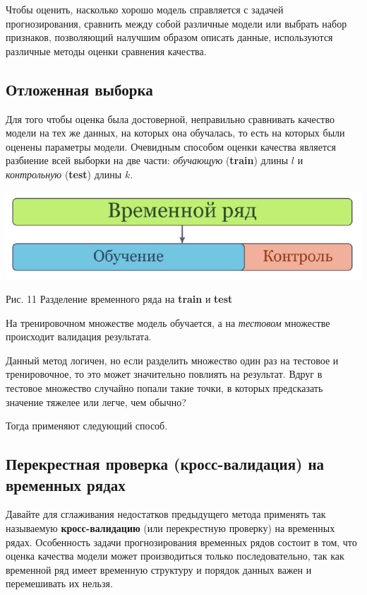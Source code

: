 \documentclass[aps,%
12pt,%
final,%
oneside,
onecolumn,%
musixtex, %
superscriptaddress,%
centertags]{article} %
\theoremstyle{plain}
\theoremstyle{definition}
\theoremstyle{remark}
\begin{document}
Чтобы оценить, насколько хорошо модель справляется с задачей прогнозирования, сравнить между собой различные модели или выбрать набор признаков, позволяющий налучшим образом описать данные, используются различные методы оценки сравнения качества.

\subsection{Отложенная выборка}

Для того чтобы оценка была достоверной, неправильно сравнивать качество модели на тех же данных, на которых она обучалась, то есть на которых были оценены параметры модели.  Очевидным способом оценки качества является разбиение всей выборки на две части: \textit{обучающую} (\textbf{train}) длины $l$ и \textit{контрольную} (\textbf{test}) длины $k$.

\begin{center}
	\includegraphics[scale=0.5]{images/11.png}

	Рис. 11 Разделение временного ряда на \textbf{train} и \textbf{test}
\end{center}

	
На тренировочном множестве модель обучается, а на \textit{тестовом} множестве происходит валидация результата. 

Данный метод логичен, но если разделить множество один раз на тестовое и тренировочное, то это может значительно повлиять на результат. Вдруг в тестовое множество случайно попали такие точки, в которых предсказать значение тяжелее или легче, чем обычно?

Тогда применяют следующий способ.
 
\newpage

\subsection{Перекрестная проверка (кросс-валидация) на временных рядах}

Давайте для сглаживания недостатков предыдущего метода применять так называемую \textbf{кросс-валидацию} (или перекрестную проверку) на временных рядах. Особенность задачи прогнозирования временных рядов состоит в том, что оценка качества модели может производиться только последовательно, так как временной ряд имеет временную структуру и порядок данных важен и перемешивать их нельзя.
\end{document}

